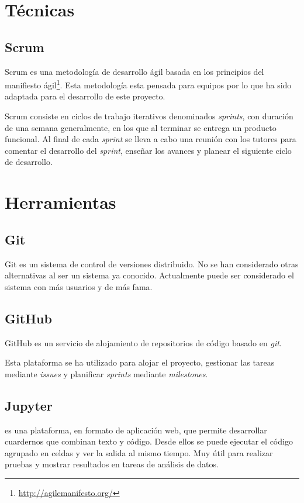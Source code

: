 
\section{Técnicas}

\subsection{Scrum}
Scrum es una metodología de desarrollo ágil basada en los principios del manifiesto ágil\footnote{\url{http://agilemanifesto.org/}}. Esta metodología esta pensada para equipos por lo que ha sido adaptada para el desarrollo de este proyecto.

Scrum consiste en ciclos de trabajo iterativos denominados \textit{sprints}, con duración de una semana generalmente, en los que al terminar se entrega un producto funcional. Al final de cada \textit{sprint} se lleva a cabo una reunión con los tutores para comentar el desarrollo del \textit{sprint}, enseñar los avances y planear el siguiente ciclo de desarrollo.

\section{Herramientas}

\subsection{Git}
Git es un sistema de control de versiones distribuido. No se han considerado otras alternativas al ser un sistema ya conocido. Actualmente puede ser considerado el sistema con más usuarios y de más fama.

\subsection{GitHub}
GitHub es un servicio de alojamiento de repositorios de código basado en \textit{git}.

Esta plataforma se ha utilizado para alojar el proyecto, gestionar las tareas mediante \textit{issues} y planificar \textit{sprints} mediante \textit{milestones}.

\subsection{Jupyter}
 es una plataforma, en formato de aplicación web, que permite desarrollar cuardernos que combinan texto y código. Desde ellos se puede ejecutar el código agrupado en celdas y ver la salida al mismo tiempo. Muy útil para realizar pruebas y mostrar resultados en tareas de análisis de datos.

